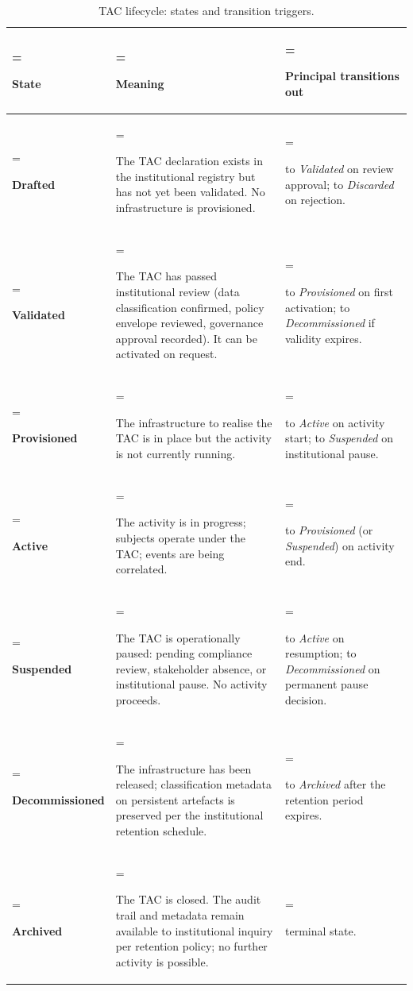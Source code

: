 \begin{table}[H]
\centering\small
\caption{TAC lifecycle: states and transition triggers.}
\label{tab:cf-lifecycle}
\begin{tabularx}{\textwidth}{%
  >{\hsize=0.5\hsize\linewidth=\hsize\bfseries\raggedright\arraybackslash}X%
  >{\hsize=1.5\hsize\linewidth=\hsize\raggedright\arraybackslash}X%
  >{\hsize=1.0\hsize\linewidth=\hsize\raggedright\arraybackslash}X%
}
\toprule
State & Meaning & Principal transitions out \\
\midrule
\textbf{Drafted}
  & The TAC declaration exists in the institutional registry but
    has not yet been validated. No infrastructure is provisioned.
  & to \emph{Validated} on review approval; to \emph{Discarded}
    on rejection. \\
\addlinespace
\textbf{Validated}
  & The TAC has passed institutional review (data classification
    confirmed, policy envelope reviewed, governance approval
    recorded). It can be activated on request.
  & to \emph{Provisioned} on first activation; to
    \emph{Decommissioned} if validity expires. \\
\addlinespace
\textbf{Provisioned}
  & The infrastructure to realise the TAC is in place but the
    activity is not currently running.
  & to \emph{Active} on activity start; to \emph{Suspended} on
    institutional pause. \\
\addlinespace
\textbf{Active}
  & The activity is in progress; subjects operate under the
    TAC; events are being correlated.
  & to \emph{Provisioned} (or \emph{Suspended}) on activity end. \\
\addlinespace
\textbf{Suspended}
  & The TAC is operationally paused: pending compliance review,
    stakeholder absence, or institutional pause. No activity
    proceeds.
  & to \emph{Active} on resumption; to \emph{Decommissioned} on
    permanent pause decision. \\
\addlinespace
\textbf{Decommissioned}
  & The infrastructure has been released; classification metadata
    on persistent artefacts is preserved per the institutional
    retention schedule.
  & to \emph{Archived} after the retention period expires. \\
\addlinespace
\textbf{Archived}
  & The TAC is closed. The audit trail and metadata remain
    available to institutional inquiry per retention policy; no
    further activity is possible.
  & terminal state. \\
\bottomrule
\end{tabularx}
\end{table}

